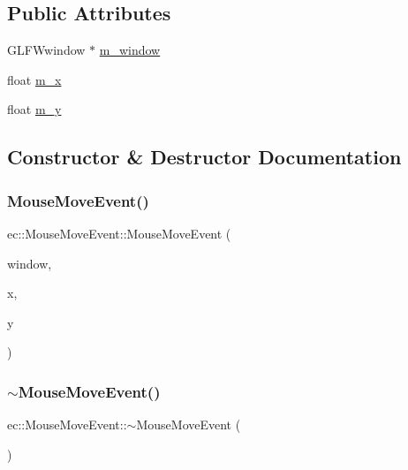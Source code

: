 \subsection*{Public Attributes}
\begin{DoxyCompactItemize}
\item 
G\+L\+F\+Wwindow $\ast$ \mbox{\hyperlink{structec_1_1_mouse_move_event_ac1205c64a8f812566eeee2c83a4df824}{m\+\_\+window}}
\item 
float \mbox{\hyperlink{structec_1_1_mouse_move_event_a2e6f479609b2919db2623111e240284e}{m\+\_\+x}}
\item 
float \mbox{\hyperlink{structec_1_1_mouse_move_event_a559559f7d2ae5a689963f71f28ad2409}{m\+\_\+y}}
\end{DoxyCompactItemize}


\subsection{Constructor \& Destructor Documentation}
\mbox{\label{structec_1_1_mouse_move_event_a3783a260f9b525df43a628cc2dff7611}} 
\subsubsection{\texorpdfstring{Mouse\+Move\+Event()}{MouseMoveEvent()}}
{\footnotesize\ttfamily ec\+::\+Mouse\+Move\+Event\+::\+Mouse\+Move\+Event (\begin{DoxyParamCaption}\item[{G\+L\+F\+Wwindow $\ast$}]{window,  }\item[{const float}]{x,  }\item[{const float}]{y }\end{DoxyParamCaption})}

\mbox{\label{structec_1_1_mouse_move_event_a9839ac53047ea0bcfd23010b66c9cef5}} 
\subsubsection{\texorpdfstring{$\sim$\+Mouse\+Move\+Event()}{~MouseMoveEvent()}}
{\footnotesize\ttfamily ec\+::\+Mouse\+Move\+Event\+::$\sim$\+Mouse\+Move\+Event (\begin{DoxyParamCaption}{ }\end{DoxyParamCaption})}



